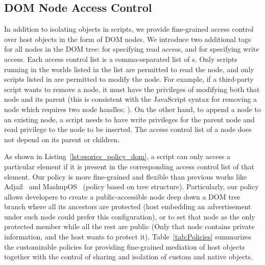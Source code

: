 \subsection{DOM Node Access Control} 
\label{sec:esorics_policy_dom}

\lstset{xleftmargin=.2\textwidth,xrightmargin=.2\textwidth}


In addition to isolating objects in scripts, we provide fine-grained access control over host objects in the form of DOM nodes.   We introduce two additional tags for all nodes in the DOM tree:  for specifying read access, and  for specifying write access.  Each access control list is a comma-separated list of s.  Only scripts running in the worlds listed in the  list are permitted to read the node, and only scripts listed in  are permitted to modify the node.  For example, if a third-party script wants to remove a node, it must have the privileges of modifying both that node and its parent (this is consistent with the JavaScript syntax for removing a node which requires two node handles: ).  On the other hand, to append a node to an existing node, a script needs to have write privileges for the parent node and read privilege to the node to be inserted.  The access control list of a node does not depend on its parent or children.  

As shown in Listing~\ref{lst:esorics_policy_dom}, a script can only access a particular  element if it is present in the corresponding access control list of that element.  Our policy is more fine-grained and flexible than previous works like Adjail~\cite{Adjail} and MashupOS~\cite{MashupOS} (policy based on tree structure).  Particularly, our policy allows developers to create a public-accessible node deep down a DOM tree branch where all its ancestors are protected (host embedding an advertisement under such node could prefer this configuration), or to set that node as the only protected member while all the rest are public (Only that node contains private information, and the host wants to protect it).  Table~\ref{tab:Policies} summarizes the customizable policies for providing fine-grained mediation of host objects together with the control of sharing and isolation of custom and native objects.

